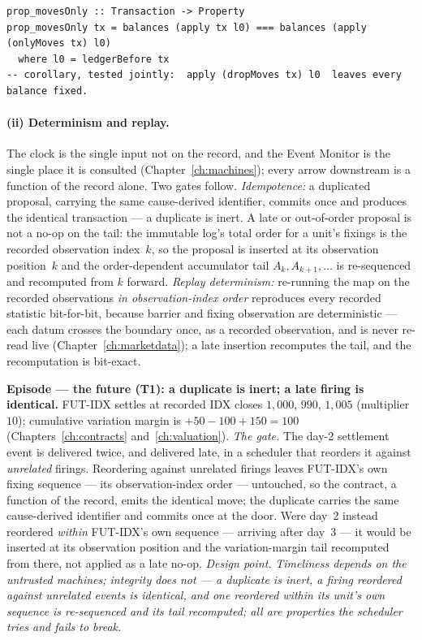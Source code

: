 \begin{lstlisting}
prop_movesOnly :: Transaction -> Property
prop_movesOnly tx = balances (apply tx l0) === balances (apply (onlyMoves tx) l0)
  where l0 = ledgerBefore tx
-- corollary, tested jointly:  apply (dropMoves tx) l0  leaves every balance fixed.
\end{lstlisting}

\paragraph{(ii) Determinism and replay.}
The clock is the single input not on the record, and the Event Monitor is the single place it
is consulted (Chapter~\ref{ch:machines}); every arrow downstream is a function of the record
alone. Two gates follow. \emph{Idempotence:} a duplicated proposal, carrying the same
cause-derived identifier, commits once and produces the identical transaction --- a
duplicate is inert. A late or out-of-order proposal is not a no-op on the tail: the
immutable log's total order for a unit's fixings is the recorded observation index~$k$, so
the proposal is inserted at its observation position~$k$ and the order-dependent accumulator
tail $A_{k},A_{k+1},\dots$ is re-sequenced and recomputed from $k$ forward. \emph{Replay
determinism:} re-running the map on the recorded observations \emph{in observation-index
order} reproduces every recorded statistic bit-for-bit, because barrier and fixing
observation are deterministic --- each datum crosses the boundary once, as a recorded
observation, and is never re-read live (Chapter~\ref{ch:marketdata}); a late insertion
recomputes the tail, and the recomputation is bit-exact.

\medskip\noindent\textbf{Episode --- the future (T1): a duplicate is inert; a late firing is
identical.}
FUT-IDX settles at recorded IDX closes $1{,}000$, $990$, $1{,}005$ (multiplier $10$);
cumulative variation margin is $+50-100+150 = 100$ (Chapters~\ref{ch:contracts}
and~\ref{ch:valuation}). \emph{The gate.} The day-2 settlement event is delivered twice, and
delivered late, in a scheduler that reorders it against \emph{unrelated} firings. Reordering
against unrelated firings leaves FUT-IDX's own fixing sequence --- its observation-index
order --- untouched, so the contract, a function of the record, emits the identical
 move; the duplicate carries the same cause-derived identifier and commits once at
the door. Were day~2 instead reordered \emph{within} FUT-IDX's own sequence --- arriving
after day~3 --- it would be inserted at its observation position and the variation-margin
tail recomputed from there, not applied as a late no-op. \emph{Design point.}
\emph{Timeliness depends on the untrusted machines; integrity does not --- a duplicate is
inert, a firing reordered against unrelated events is identical, and one reordered within
its unit's own sequence is re-sequenced and its tail recomputed; all are properties the
scheduler tries and fails to break.}

